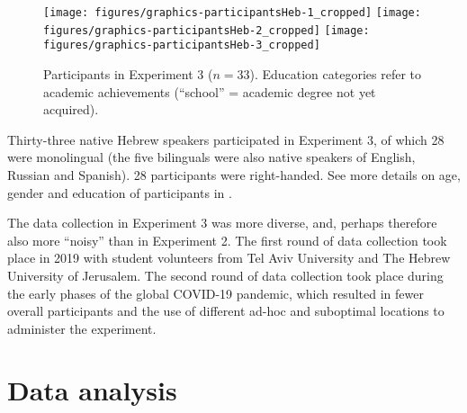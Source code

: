 \begin{figure}
\texttt{[image: figures/graphics-participantsHeb-1\_cropped]} \texttt{[image: figures/graphics-participantsHeb-2\_cropped]} \texttt{[image: figures/graphics-participantsHeb-3\_cropped]} \caption{Participants in Experiment 3 ($n = 33$). Education categories refer to academic achievements (\enquote{school} = academic degree not yet acquired).}\label{fig:participantsHeb}
\end{figure}

Thirty-three native Hebrew speakers participated in Experiment 3, of which 28 were monolingual (the five bilinguals were also native speakers of English, Russian and Spanish). 28 participants were right-handed. See more details on age, gender and education of participants in .

The data collection in Experiment 3 was more diverse, and, perhaps therefore also more \enquote{noisy} than in Experiment 2.
The first round of data collection took place in 2019 with student volunteers from Tel Aviv University and The Hebrew University of Jerusalem. The second round of data collection took place during the early phases of the global COVID-19 pandemic, which resulted in fewer overall participants and the use of different ad-hoc and suboptimal locations to administer the experiment.

\section{Data analysis}\label{sec:datanlysis}

